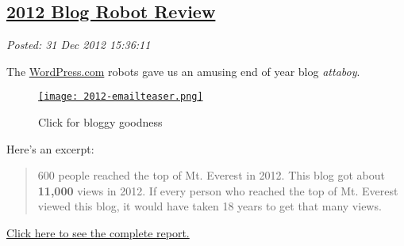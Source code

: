 %

\subsection*{\href{https://bakerjd99.wordpress.com/2012/12/31/2012-blog-robot-review/}{2012 Blog Robot Review}}


\noindent\emph{Posted: 31 Dec 2012 15:36:11}
\vspace{6pt}

The \href{http://wordpress.com/}{WordPress.com} robots gave us an amusing end of year blog
\emph{attaboy}.

\captionsetup[figure]{labelformat=empty}
\begin{figure}[htbp]
\centering
\href{http://bakerjd99.wordpress.com/2012/annual-report/}{\texttt{[image: 2012-emailteaser.png]}}
\caption{Click for bloggy goodness}
\label{fig:3653X0}
\end{figure}


Here's an excerpt:

\begin{quote}
600 people reached the top of Mt. Everest in 2012. This blog got about
\textbf{11,000} views in 2012. If every person who reached the top of
Mt. Everest viewed this blog, it would have taken 18 years to get that
many views.
\end{quote}

\href{http://bakerjd99.wordpress.com/2012/annual-report/}{Click here to
see the complete report.}




%